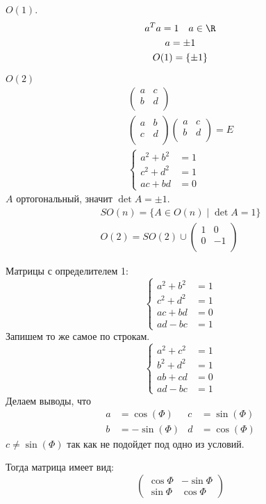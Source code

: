 \begin{exmp}
	$O(1)$.
	\begin{gather*}
		a^T a = 1 \quad a \in \R \\
		a = \pm 1 \\
		O(1) = \{\pm 1\}
	\end{gather*}
\end{exmp}
\begin{exmp}
	$O(2)$
	\begin{gather*}
		\begin{pmatrix} a & c \\ b & d \\ \end{pmatrix} \\
		\begin{pmatrix} a & b \\ c & d \\ \end{pmatrix} \begin{pmatrix} a & c \\ b & d \\ \end{pmatrix} = E \\
		\left\{\begin{aligned}
			a^2 + b^2 &= 1 \\
			c^2 + d^2 &= 1 \\
			a c + b d &= 0
		\end{aligned}\right.
	\end{gather*}
	$A$ ортогональный, значит $\det A = \pm 1$.
	\begin{gather*}
		SO(n) = \{ A \in O(n) \mid \det A = 1\} \\
		O(2) = SO(2) \cup \begin{pmatrix} 1 & 0 \\ 0 & -1 \\ \end{pmatrix}
	\end{gather*}

	Матрицы с определителем 1:
	\[\left\{\begin{aligned}
		a^2 + b^2 &= 1 \\
		c^2 + d^2 &= 1 \\
		a c + b d &= 0 \\
		a d - b c &= 1
	\end{aligned}\right.\]
	Запишем то же самое по строкам.
	\[\left\{\begin{aligned}
		a^2 + c^2 &= 1 \\
		b^2 + d^2 &= 1 \\
		a b + c d &= 0 \\
		a d - b c &= 1
	\end{aligned}\right.\]
	Делаем выводы, что
	\begin{align*}
		a &=  \cos(\Phi) & c &= \sin(\Phi) \\
		b &= -\sin(\Phi) & d &= \cos(\Phi)
	\end{align*}
	$c \ne \sin(\Phi)$ так как не подойдет под одно из условий.

	Тогда матрица имеет вид:
	\[\begin{pmatrix}
		\cos \Phi & -\sin \Phi \\
		\sin \Phi &  \cos \Phi
	\end{pmatrix}\]
\end{exmp}
